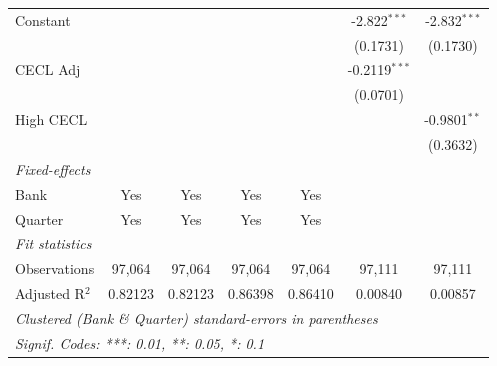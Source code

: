 \begin{tabular}{lcccccc}
   Constant                       &                 &                 &                 &                 & -2.822$^{***}$  & -2.832$^{***}$\\   
                                  &                 &                 &                 &                 & (0.1731)        & (0.1730)\\   
   CECL Adj                       &                 &                 &                 &                 & -0.2119$^{***}$ &   \\   
                                  &                 &                 &                 &                 & (0.0701)        &   \\   
   High CECL                      &                 &                 &                 &                 &                 & -0.9801$^{**}$\\   
                                  &                 &                 &                 &                 &                 & (0.3632)\\   
   \midrule
   \emph{Fixed-effects}\\
   Bank                           & Yes             & Yes             & Yes             & Yes             &                 & \\  
   Quarter                        & Yes             & Yes             & Yes             & Yes             &                 & \\  
   \midrule
   \emph{Fit statistics}\\
   Observations                   & 97,064          & 97,064          & 97,064          & 97,064          & 97,111          & 97,111\\  
   Adjusted R$^2$                 & 0.82123         & 0.82123         & 0.86398         & 0.86410         & 0.00840         & 0.00857\\  
   \midrule \midrule
   \multicolumn{7}{l}{\emph{Clustered (Bank \& Quarter) standard-errors in parentheses}}\\
   \multicolumn{7}{l}{\emph{Signif. Codes: ***: 0.01, **: 0.05, *: 0.1}}\\
\end{tabular}
\par\endgroup


